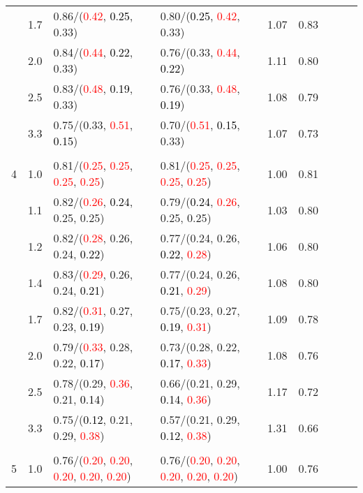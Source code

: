 \documentclass[10pt,a4paper]{report}
\begin{document}
\begin{table}[!htbp]
\begin{center}
{\begin{tabular}{ccllccccc}
			&1.7&0.86/(\textcolor{red}{0.42}, \textcolor{black}{0.25}, 0.33)&0.80/(\textcolor{black}{0.25}, \textcolor{red}{0.42}, 0.33)&1.07&0.83\\
			&2.0&0.84/(\textcolor{red}{0.44}, \textcolor{black}{0.22}, 0.33)&0.76/(0.33, \textcolor{red}{0.44}, \textcolor{black}{0.22})&1.11&0.80\\
			&2.5&0.83/(\textcolor{red}{0.48}, \textcolor{black}{0.19}, 0.33)&0.76/(0.33, \textcolor{red}{0.48}, \textcolor{black}{0.19})&1.08&0.79\\
			&3.3&0.75/(0.33, \textcolor{red}{0.51}, \textcolor{black}{0.15})&0.70/(\textcolor{red}{0.51}, \textcolor{black}{0.15}, 0.33)&1.07&0.73\\
			&&&&\\
			4			&1.0&0.81/(\textcolor{red}{0.25}, \textcolor{red}{0.25}, \textcolor{red}{0.25}, \textcolor{red}{0.25})&0.81/(\textcolor{red}{0.25}, \textcolor{red}{0.25}, \textcolor{red}{0.25}, \textcolor{red}{0.25})&1.00&0.81\\
			&1.1&0.82/(\textcolor{red}{0.26}, \textcolor{black}{0.24}, 0.25, 0.25)&0.79/(\textcolor{black}{0.24}, \textcolor{red}{0.26}, 0.25, 0.25)&1.03&0.80\\
			&1.2&0.82/(\textcolor{red}{0.28}, 0.26, 0.24, \textcolor{black}{0.22})&0.77/(0.24, 0.26, \textcolor{black}{0.22}, \textcolor{red}{0.28})&1.06&0.80\\
			&1.4&0.83/(\textcolor{red}{0.29}, 0.26, 0.24, \textcolor{black}{0.21})&0.77/(0.24, 0.26, \textcolor{black}{0.21}, \textcolor{red}{0.29})&1.08&0.80\\
			&1.7&0.82/(\textcolor{red}{0.31}, 0.27, 0.23, \textcolor{black}{0.19})&0.75/(0.23, 0.27, \textcolor{black}{0.19}, \textcolor{red}{0.31})&1.09&0.78\\
			&2.0&0.79/(\textcolor{red}{0.33}, 0.28, 0.22, \textcolor{black}{0.17})&0.73/(0.28, 0.22, \textcolor{black}{0.17}, \textcolor{red}{0.33})&1.08&0.76\\
			&2.5&0.78/(0.29, \textcolor{red}{0.36}, 0.21, \textcolor{black}{0.14})&0.66/(0.21, 0.29, \textcolor{black}{0.14}, \textcolor{red}{0.36})&1.17&0.72\\
			&3.3&0.75/(\textcolor{black}{0.12}, 0.21, 0.29, \textcolor{red}{0.38})&0.57/(0.21, 0.29, \textcolor{black}{0.12}, \textcolor{red}{0.38})&1.31&0.66\\
			&&&&\\
			5			&1.0&0.76/(\textcolor{red}{0.20}, \textcolor{red}{0.20}, \textcolor{red}{0.20}, \textcolor{red}{0.20}, \textcolor{red}{0.20})&0.76/(\textcolor{red}{0.20}, \textcolor{red}{0.20}, \textcolor{red}{0.20}, \textcolor{red}{0.20}, \textcolor{red}{0.20})&1.00&0.76\\

\end{tabular}}
\end{center}
\end{table}
\end{document}
